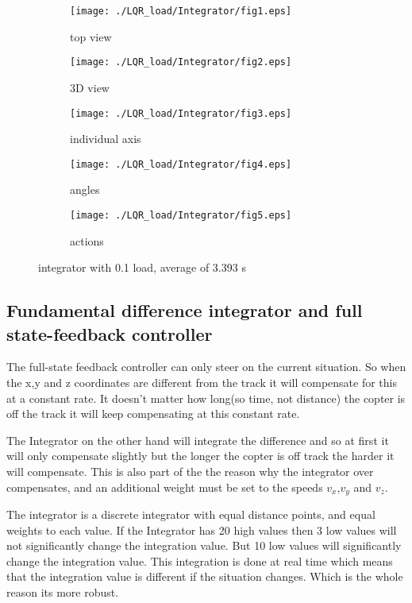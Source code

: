 \begin{figure}[H]
	\centering
	\begin{subfigure}[b]{0.3\textwidth}
		\texttt{[image: ./LQR\_load/Integrator/fig1.eps]}
		\caption{top view}
	\end{subfigure}
	\begin{subfigure}[b]{0.3\textwidth}
		\texttt{[image: ./LQR\_load/Integrator/fig2.eps]}
		\caption{3D view}
	\end{subfigure}
	\begin{subfigure}[b]{0.3\textwidth}
		\texttt{[image: ./LQR\_load/Integrator/fig3.eps]}
		\caption{individual axis}
	\end{subfigure}
	\begin{subfigure}[b]{0.3\textwidth}
		\texttt{[image: ./LQR\_load/Integrator/fig4.eps]}
		\caption{angles}
	\end{subfigure}
	\begin{subfigure}[b]{0.3\textwidth}
		\texttt{[image: ./LQR\_load/Integrator/fig5.eps]}
		\caption{actions}
	\end{subfigure}
	\caption{integrator with 0.1 load, average of 3.393 s}\label{fig:Integrator with load}
\end{figure}

\subsection{Fundamental difference integrator and full state-feedback controller}
The full-state feedback controller can only steer on the current situation. So when the x,y and z coordinates are different from the track it will compensate for this at a constant rate. It doesn't matter how long(so time, not distance) the copter is off the track it will keep compensating at this constant rate. 

The Integrator on the other hand will integrate the difference and so at first it will only compensate slightly but the longer the copter is off track the harder it will compensate. This is also part of the the reason why the integrator over compensates, and an additional weight must be set to the speeds $v_x$,$v_y$ and $v_z$.

The integrator is a discrete integrator with equal distance points, and equal weights to each value. If the Integrator has 20 high values then 3 low values will not significantly change the integration value. But 10 low values will significantly change the integration value. This integration is done at real time which means that the integration value is different if the situation changes. Which is the whole reason its more robust.


